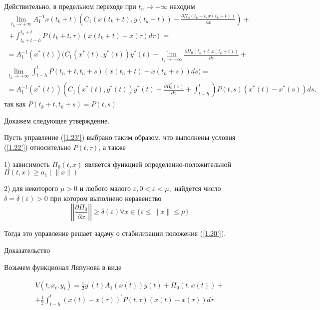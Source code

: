 Действительно, в предельном переходе при $t_n \to + \infty$ находим 
$$
\begin{array}{c}
\displaystyle \lim_{t_k \to + \infty} A_1^{-1} x(t_k + t) (C_1 (x(t_k + t), y(t_k + t)) - \frac{\partial \Pi_0 (t_k + t, x(t_k + t))}{\partial x})+\\
\displaystyle + \int_{t_k+t-h}^{t_k+t} P(t_k + t, \tau) (x(t_k + t) - x(\tau) d \tau)=\\
\end{array}
$$
$$
\begin{array}{c}
\displaystyle = A_1^{-1} (x^{*} (t)) (C_1 (x^{*}(t), y^{*}(t)) y^{*}(t) - \lim_{t_k \to + \infty} \frac{\partial \Pi_0 (t_k +t, x (t_k + t))}{\partial x} +\\
\displaystyle \lim_{t_k \to + \infty} \int_{t - h}^{t} P(t_n + t, t_n + s) ( x(t_n + t) - x(t_n + s)) ds) =\\
\displaystyle =A_1^{-1} ( x^{*} (t)) (C_1 (x^{*} (t), y^{*}(t)) y^{*} (t) - \frac{\partial \Pi_0^{*} (x)}{\partial x} + \int_{t - h}^{t}) P (t, s) (x^{*} (t) - x^{*} (s)) ds,
\end{array}
$$
так как $P(t_k + t, t_k + s) = P(t, s)$

Докажем следующее утверждение. 

\begin{theorem} \label{1.6'}
Пусть управление (\ref{1.23'}) выбрано таким образом, что выполнены условия (\ref{1.22'}) относительно $P(t, \tau)$, а также 

1) зависимость $\Pi_0 (t, x)$ является функцией определенно-положительной $\Pi (t, x) \ge a_1 (\| x \|)$

 2) для некоторого $\mu > 0$ и любого малого $\varepsilon, 0 < \varepsilon < \mu, $ найдется число $\delta = \delta (\varepsilon) > 0$ при котором выполнено неравенство $$\left| \left| \frac{\partial \Pi_0}{\partial x} \right| \right| \ge \delta (\varepsilon) \forall x \in \lbrace \varepsilon \le \| x \| \le \mu \rbrace$$

Тогда это управление решает задачу о стабилизации положения (\ref{1.20'}).
\end{theorem}

Доказательство

Возьмем функционал Ляпунова в виде 

\begin{equation} \label{1.26'}
	\begin{array}{c}
		\displaystyle V(t, x_t, y_t) = \frac12 y^{'} (t) A_1(x(t)) y(t) + \Pi_0(t, x(t)) +\\
		\displaystyle + \frac12 \int_{t-h}^{t} (x(t) - x(\tau))^{'} P(t, \tau) (x(t) - x (\tau)) d \tau
	\end{array}
\end{equation}

